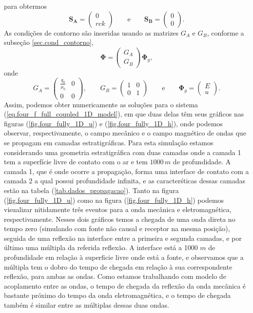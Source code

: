 para obtermos
\begin{equation*}
\mathbf{S_A}=\begin{pmatrix}
0\\
rck
\end{pmatrix}\qquad\text{e}\qquad\mathbf{S_B}=\begin{pmatrix}
0\\
0
\end{pmatrix}.
\end{equation*}
As condi\c{c}\~oes de contorno s\~ao inseridas usando as matrizes $G_A$ e $G_B$, conforme a subse\c{c}\~ao \ref{sec.cond_contorno},
\begin{equation*}
\mathbf{\Phi}=\begin{pmatrix}
G_A\\
G_B
\end{pmatrix}\mathbf{\Phi}_g,
\end{equation*}
onde
\begin{equation*}
G_A=\begin{pmatrix}
\frac{q_0}{\mu_0}&0\\
0&0
\end{pmatrix},\qquad G_B=\begin{pmatrix}
1&0\\
0&1
\end{pmatrix}\qquad\text{e}\qquad\mathbf{\Phi}_g=\begin{pmatrix}
E\\
u
\end{pmatrix}.
\end{equation*}
Assim, podemos obter numericamente as solu\c{c}\~oes para o sistema (\ref{eq.four_f_full_coupled_1D_model}), em que duas delas t\^em seus gr\'aficos nas figuras (\ref {fig.four_fully_1D_u}) e (\ref{fig.four_fully_1D_h}), onde podemos observar, respectivamente, o campo mec\^anico e o campo magn\'etico de ondas que se propagam em camadas estratigr\'aficas. Para esta simula\c{c}\~ao estamos considerando uma geometria estratigr\'afica com duas camadas onde a camada 1 tem a superf\'icie livre de contato com o ar e tem $1000\,m$ de profundidade. A camada 1, que \'e onde ocorre a propaga\c{c}\~ao, forma uma interface de contato com a camada 2 a qual possui profundidade infinita, e as caracter\'sticas dessas camadas est\~ao na tabela (\ref{tab.dados_propagacao}). Tanto na figura  (\ref {fig.four_fully_1D_u}) como na figura (\ref{fig.four_fully_1D_h}) podemos visualizar nitidamente tr\^es eventos para a onda mec\^anica e eletromagn\'etica, respectivamente. Nesses dois gr\'aficos temos a chegada de uma onda direta no tempo zero (simulando com fonte n\~ao causal e receptor na mesma posi\c{c}\~ao), seguida de uma reflex\~ao na interface entre a primeira e segunda camadas, e por \'ultimo uma m\'ultipla da referida reflex\~ao. A interface est\'a a 1000 $m$ de profundidade em rela\c{c}\~ao \`a superficie livre onde est\'a a fonte, e observamos que a m\'ultipla tem o dobro do tempo de chegada em rela\c{c}\~ao \`a sua correspondente reflex\~ao, para ambas as ondas. Como estamos trabalhando com modelo de acoplamento entre as ondas, o tempo de chegada da reflex\~ao da onda mec\^anica \'e bastante pr\'oximo do tempo da onda eletromagn\'etica, e o tempo de chegada tamb\'em \'e similar entre as m\'ultiplas dessas duas ondas.

